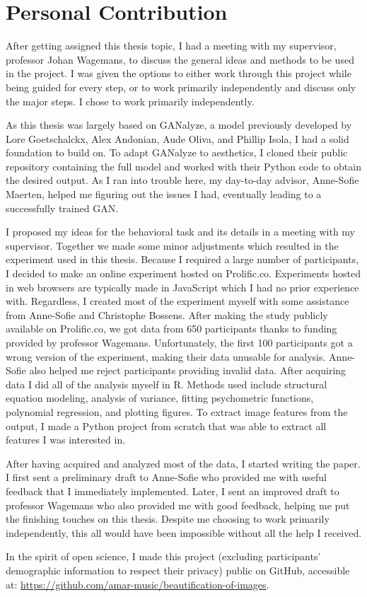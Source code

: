 \documentclass[../main.tex]{subfiles}
\begin{document}
\newpage
\section{Personal Contribution}
After getting assigned this thesis topic, I had a meeting with my supervisor, professor Johan Wagemans, to discuss the general ideas and methods to be used in the project. I was given the options to either work through this project while being guided for every step, or to work primarily independently and discuss only the major steps. I chose to work primarily independently.

As this thesis was largely based on GANalyze, a model previously developed by Lore Goetschalckx, Alex Andonian, Aude Oliva, and Phillip Isola, I had a solid foundation to build on. To adapt GANalyze to aesthetics, I cloned their public repository containing the full model and worked with their Python code to obtain the desired output. As I ran into trouble here, my day-to-day advisor, Anne-Sofie Maerten, helped me figuring out the issues I had, eventually leading to a successfully trained GAN.

I proposed my ideas for the behavioral task and its details in a meeting with my supervisor. Together we made some minor adjustments which resulted in the experiment used in this thesis. Because I required a large number of participants, I decided to make an online experiment hosted on Prolific.co. Experiments hosted in web browsers are typically made in JavaScript which I had no prior experience with. Regardless, I created most of the experiment myself with some assistance from Anne-Sofie and Christophe Bossens. After making the study publicly available on Prolific.co, we got data from 650 participants thanks to funding provided by professor Wagemans. Unfortunately, the first 100 participants got a wrong version of the experiment, making their data unusable for analysis. Anne-Sofie also helped me reject participants providing invalid data. After acquiring data I did all of the analysis myself in R. Methods used include structural equation modeling, analysis of variance, fitting psychometric functions, polynomial regression, and plotting figures. To extract image features from the output, I made a Python project from scratch that was able to extract all features I was interested in. 

After having acquired and analyzed most of the data, I started writing the paper. I first sent a preliminary draft to Anne-Sofie who provided me with useful feedback that I immediately implemented. Later, I sent an improved draft to professor Wagemans who also provided me with good feedback, helping me put the finishing touches on this thesis. Despite me choosing to work primarily independently, this all would have been impossible without all the help I received.

In the spirit of open science, I made this project (excluding participants' demographic information to respect their privacy) public on GitHub, accessible at: \newline \url{https://github.com/amar-music/beautification-of-images}.
\end{document}
